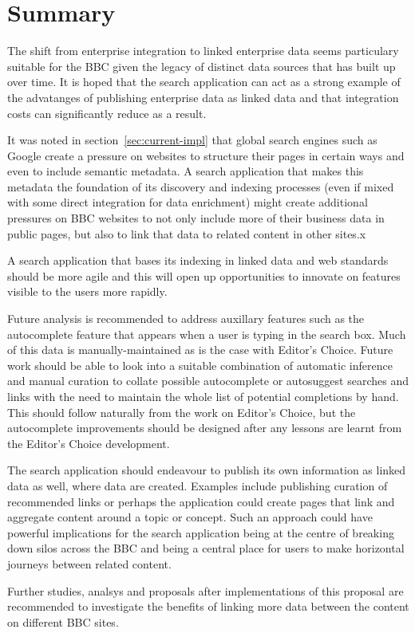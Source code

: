 \chapter{Summary}

The shift from enterprise integration to linked enterprise data
seems particulary suitable for the BBC given the legacy of
distinct data sources that has built up over time. It is hoped that
the search application can act as a strong example of the advatanges
of publishing enterprise data as linked data and that integration
costs can significantly reduce as a result.

It was noted in section~\ref{sec:current-impl} that global search
engines such as Google create a pressure on websites to structure
their pages in certain ways and even to include semantic metadata. A
search application that makes this metadata the foundation of its
discovery and indexing processes (even if mixed with some direct integration
for data enrichment) might create additional pressures on BBC websites
to not only include more of their business data in public pages, but
also to link that data to related content in other sites.x

A search application that bases its indexing in linked data and
web standards should be more agile and this will open up opportunities
to innovate on features visible to the users more rapidly.

Future analysis is recommended to address auxillary features such as
the autocomplete\cite{morville2010search} feature that appears when a user
is typing in
the search box. Much of this data is manually-maintained as is the case
with Editor's Choice. Future work should be able to look into a suitable
combination of automatic inference and manual curation to collate
possible autocomplete or autosuggest searches and links with the need to
maintain the whole list of potential completions by hand. This should follow
naturally from the work on Editor's Choice, but the autocomplete
improvements should
be designed after any lessons are learnt from the Editor's Choice development.

The search application should endeavour to publish its own information
as linked data as well, where data are created. Examples include publishing
curation of recommended links or perhaps the application could create
pages that link and aggregate content around a topic or concept. Such an
approach could have powerful implications for the search application being
at the centre of breaking down silos across the BBC and being a central
place for users to make horizontal journeys between related content.

Further studies, analsys and proposals after implementations of this proposal
are recommended to investigate the benefits of linking more data
between the content on different BBC sites.
